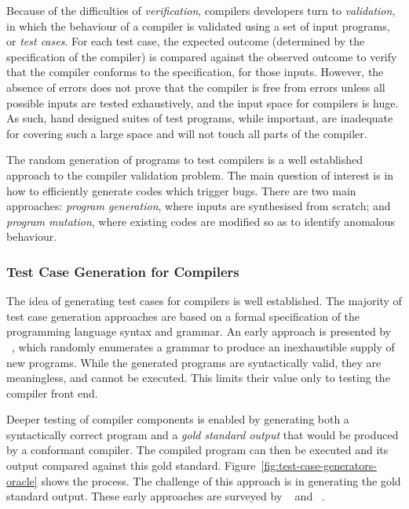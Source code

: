 Because of the difficulties of \emph{verification}, compilers developers turn to \emph{validation}, in which the behaviour of a compiler is validated using a set of input programs, or \emph{test cases}. For each test case, the expected outcome (determined by the specification of the compiler) is compared against the observed outcome to verify that the compiler conforms to the specification, for those inputs. However, the absence of errors does not prove that the compiler is free from errors unless all possible inputs are tested exhaustively, and the input space for compilers is huge. As such, hand designed suites of test programs, while important, are inadequate for covering such a large space and will not touch all parts of the compiler.

The random generation of programs to test compilers is a well established approach to the compiler validation problem. The main question of interest is in how to efficiently generate codes which trigger bugs. There are two main approaches: \emph{program generation}, where inputs are synthesised from scratch; and \emph{program mutation}, where existing codes are modified so as to identify anomalous behaviour.


\subsubsection{Test Case Generation for Compilers}

The idea of generating test cases for compilers is well established. The majority of test case generation approaches are based on a formal specification of the programming language syntax and grammar.
An early approach is presented by \citeauthor{Hanford1970a}~\cite{Hanford1970a}, which randomly enumerates a grammar to produce an inexhaustible supply of new programs. While the generated programs are syntactically valid, they are meaningless, and cannot be executed. This limits their value only to testing the compiler front end.

Deeper testing of compiler components is enabled by generating both a syntactically correct program and a \emph{gold standard output} that would be produced by a conformant compiler. The compiled program can then be executed and its output compared against this gold standard. Figure~\ref{fig:test-case-generators-oracle} shows the process. The challenge of this approach is in generating the gold standard output. These early approaches are surveyed by \citeauthor{Boujarwah1997}~\cite{Boujarwah1997} and \citeauthor{Kossatchev2005}~\cite{Kossatchev2005}.

